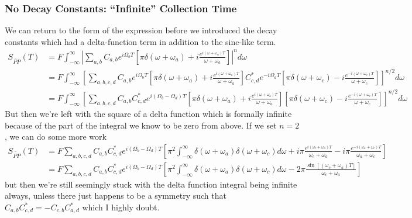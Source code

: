 \subsubsection{No Decay Constants: ``Infinite'' Collection Time}
We can return to the form of the expression before we introduced the decay constants which had a delta-function term in addition to the sinc-like term.
\begin{align}
	S_{\tilde{PP}}( T)&= F \int_{-\infty}^{\infty} \left| \sum_{a,b} C_{a,b}  e^{i \Omega_b T}  \left[ \pi \delta \left( \omega + \omega_a \right) + i\frac{e^{i (\omega + \omega_a) T}}{\omega + \omega_a} \right]   \right|^n d \omega \\
	&= F \int_{-\infty}^{\infty} \left[ \sum_{a,b, c, d} C_{a,b}  e^{i \Omega_b T}  \left[ \pi \delta \left( \omega + \omega_a \right)  + i \frac{e^{i (\omega + \omega_a) T}}{\omega + \omega_a} \right]  C_{c,d}^*  e^{-i \Omega_d T}  \left[ \pi \delta \left( \omega + \omega_c \right) - i \frac{e^{-i (\omega + \omega_c) T}}{\omega + \omega_c} \right]   \right]^{n/2} d \omega \\
	&= F \int_{-\infty}^{\infty} \left[ \sum_{a,b, c, d} C_{a,b}C_{c,d}^*  e^{i (\Omega_b - \Omega_d )T}  \left[ \pi \delta \left( \omega + \omega_a \right)  + i \frac{e^{i (\omega + \omega_a) T}}{\omega + \omega_a} \right]     \left[ \pi \delta \left( \omega + \omega_c \right) - i \frac{e^{-i (\omega + \omega_c) T}}{\omega + \omega_c} \right]   \right]^{n/2} d \omega
\end{align}
But then we're left with the square of a delta function which is formally infinite because of the part of the integral we know to be zero from above.   If we set $n=2$, we can do some more work
\begin{align}
	S_{\tilde{PP}}( T) &= F \sum_{a,b, c, d} C_{a,b}C_{c,d}^*  e^{i (\Omega_b - \Omega_d )T}  \left[ \pi^2 \int_{-\infty}^{\infty} \delta \left( \omega + \omega_a \right)\delta \left( \omega + \omega_c \right) d \omega   + i \pi \frac{e^{i (\omega_c + \omega_a) T}}{\omega_c + \omega_a}   - i \pi \frac{e^{-i (\omega_a + \omega_c) T}}{\omega_a + \omega_c}   \right]   \\
	&= F \sum_{a,b, c, d} C_{a,b}C_{c,d}^*  e^{i (\Omega_b - \Omega_d )T}  \left[ \pi^2 \int_{-\infty}^{\infty} \delta \left( \omega + \omega_a \right)\delta \left( \omega + \omega_c \right) d \omega   -2 \pi \frac{ \sin \left[ (\omega_c + \omega_a) T \right] }{\omega_c + \omega_a}    \right]
\end{align}
but then we're still seemingly stuck with the delta function integral being infinite always, unless there just happens to be a symmetry such that $C_{a,b}C_{c,d}^* = - C_{c,b}C_{a,d}^*$ which I highly doubt.




